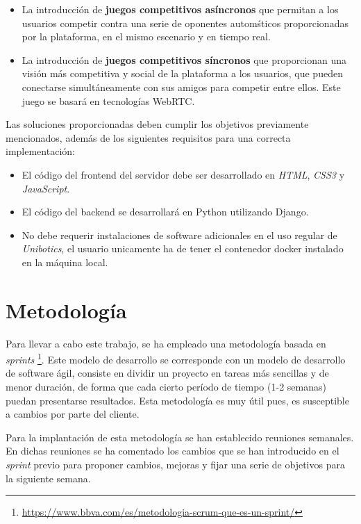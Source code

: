 \documentclass[a4paper, 12pt]{book}
\begin{document}
\begin{itemize}
\item La introducción de \textbf{juegos competitivos asíncronos} que permitan a los usuarios competir contra una serie de oponentes automśticos proporcionadas por la plataforma, en el mismo escenario y en tiempo real.
\item La introducción de \textbf{juegos competitivos síncronos} que proporcionan una visión más competitiva y social de la plataforma a los usuarios, que pueden conectarse simultáneamente con sus amigos para competir entre ellos. Este juego se basará en tecnologías WebRTC.
\end{itemize}

Las soluciones proporcionadas deben cumplir los objetivos previamente mencionados, además de los siguientes requisitos para una correcta implementación:

\begin{itemize}
\item El código del frontend del servidor debe ser desarrollado en \emph{HTML}, \emph{CSS3} y \emph{JavaScript}.
\item El código del backend se desarrollará en Python utilizando Django.
\item No debe requerir instalaciones de software adicionales en el uso regular de \emph{Unibotics}, el usuario unicamente ha de tener el contenedor docker instalado en la máquina local.
\end{itemize}

\section{Metodología}
\label{sec:metodologia}

Para llevar a cabo este trabajo, se ha empleado una metodología basada en \emph{sprints} \footnote{\url{https://www.bbva.com/es/metodologia-scrum-que-es-un-sprint/}}. Este modelo de desarrollo se corresponde con un modelo de desarrollo de software ágil, consiste en dividir un proyecto en tareas más sencillas y de menor duración, de forma que cada cierto período de tiempo (1-2 semanas) puedan presentarse resultados. Esta metodología es muy útil pues, es susceptible a cambios por parte del cliente.

Para la implantación de esta metodología se han establecido reuniones semanales. En dichas reuniones se ha comentado los cambios que se han introducido en el \emph{sprint} previo para proponer cambios, mejoras y fijar una serie de objetivos para la siguiente semana.
\end{document}
